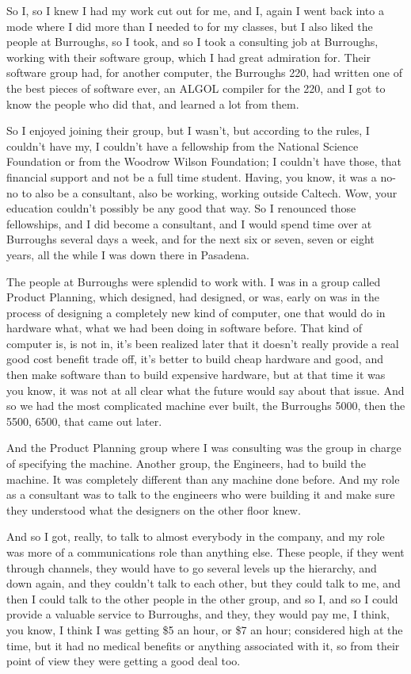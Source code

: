 \documentclass[]{article}
\begin{document}
So I, so I knew I had my work cut out for me, and I, again I went back
into a mode where I did more than I needed to for my classes, but I also
liked the people at Burroughs, so I took, and so I took a consulting job
at Burroughs, working with their software group, which I had great
admiration for. Their software group had, for another computer, the
Burroughs 220, had written one of the best pieces of software ever, an
ALGOL compiler for the 220, and I got to know the people who did that,
and learned a lot from them.

So I enjoyed joining their group, but I wasn't, but according to the
rules, I couldn't have my, I couldn't have a fellowship from the
National Science Foundation or from the Woodrow Wilson Foundation; I
couldn't have those, that financial support and not be a full time
student. Having, you know, it was a no-no to also be a consultant, also
be working, working outside Caltech. Wow, your education couldn't
possibly be any good that way. So I renounced those fellowships, and I
did become a consultant, and I would spend time over at Burroughs
several days a week, and for the next six or seven, seven or eight
years, all the while I was down there in Pasadena.

The people at Burroughs were splendid to work with. I was in a group
called Product Planning, which designed, had designed, or was, early on
was in the process of designing a completely new kind of computer, one
that would do in hardware what, what we had been doing in software
before. That kind of computer is, is not in, it's been realized later
that it doesn't really provide a real good cost benefit trade off, it's
better to build cheap hardware and good, and then make software than to
build expensive hardware, but at that time it was you know, it was not
at all clear what the future would say about that issue. And so we had
the most complicated machine ever built, the Burroughs 5000, then the
5500, 6500, that came out later.

And the Product Planning group where I was consulting was the group in
charge of specifying the machine. Another group, the Engineers, had to
build the machine. It was completely different than any machine done
before. And my role as a consultant was to talk to the engineers who
were building it and make sure they understood what the designers on the
other floor knew.

And so I got, really, to talk to almost everybody in the company, and my
role was more of a communications role than anything else. These people,
if they went through channels, they would have to go several levels up
the hierarchy, and down again, and they couldn't talk to each other, but
they could talk to me, and then I could talk to the other people in the
other group, and so I, and so I could provide a valuable service to
Burroughs, and they, they would pay me, I think, you know, I think I was
getting \$5 an hour, or \$7 an hour; considered high at the time, but it
had no medical benefits or anything associated with it, so from their
point of view they were getting a good deal too.
\end{document}
